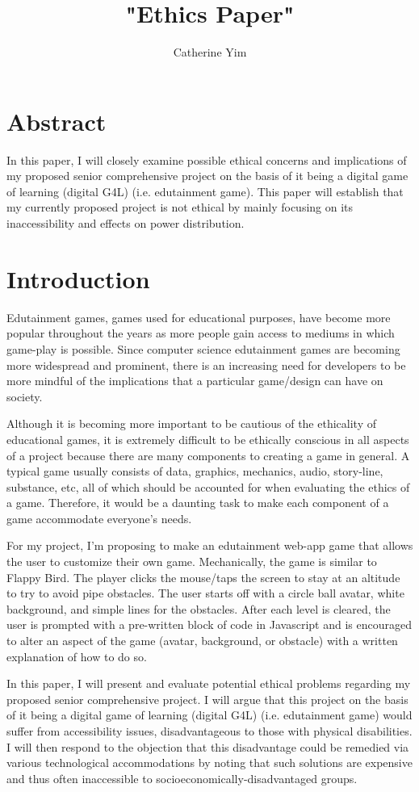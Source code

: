 \documentclass[10pt,twocolumn]{article}
\title{"Ethics Paper"}
\author{Catherine Yim}
\affiliation{Occidental College}
\begin{document}
\maketitle
\section{Abstract}
    In this paper, I will closely examine possible ethical concerns and implications of my proposed senior comprehensive project on the basis of it being a digital game of learning (digital G4L) (i.e. edutainment game). This paper will establish that my currently proposed project is not ethical by mainly focusing on its inaccessibility and effects on power distribution.


\section{Introduction}
    Edutainment games, games used for educational purposes, have become more popular throughout the years as more people gain access to mediums in which game-play is possible. Since computer science edutainment games are becoming more widespread and prominent, there is an increasing need for developers to be more mindful of the implications that a particular game/design can have on society.
    
    Although it is becoming more important to be cautious of the ethicality of educational games, it is extremely difficult to be ethically conscious in all aspects of a project because there are many components to creating a game in general. A typical game usually consists of data, graphics, mechanics, audio, story-line, substance, etc, all of which should be accounted for when evaluating the ethics of a game. Therefore, it would be a daunting task to make each component of a game accommodate everyone's needs. 
    
    For my project, I’m proposing to make an edutainment web-app game that allows the user to customize their own game. Mechanically, the game is similar to Flappy Bird. The player clicks the mouse/taps the screen to stay at an altitude to try to avoid pipe obstacles. The user starts off with a circle ball avatar, white background, and simple lines for the obstacles. After each level is cleared, the user is prompted with a pre-written block of code in Javascript and is encouraged to alter an aspect of the game (avatar, background, or obstacle) with a written explanation of how to do so. 
    
    In this paper, I will present and evaluate potential ethical problems regarding my proposed senior comprehensive project. I will argue that this project on the basis of it being a digital game of learning (digital G4L) (i.e. edutainment game) would suffer from accessibility issues, disadvantageous to those with physical disabilities. I will then respond to the objection that this disadvantage could be remedied via various technological accommodations by noting that such solutions are expensive and thus often inaccessible to socioeconomically-disadvantaged groups.
\end{document}
